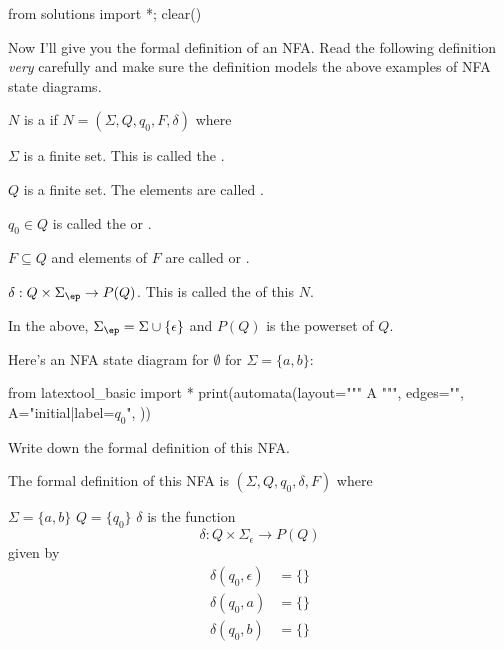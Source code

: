 \begin{python0}
  from solutions import *; clear()
\end{python0}

Now I'll give you the formal definition of an NFA.
Read the following
definition \textit{very} carefully and make sure the definition models
the above examples of NFA state diagrams.

\begin{defn}
  $N$ is a
  if $N =
  (\Sigma,Q,q_0,F,\delta)$ where
  \begin{tightlist}
  \item $\Sigma$ is a finite set. This is called the
    .
  \item $Q$ is a finite set. The elements are called
    .
  \item $q_0 \in Q$ is called the
    or
    \tinysidebarskip{}\sidebarskip{0pt}.
  \item $F \subseteq Q$ and elements of $F$ are called
    or
    \tinysidebarskip{}\sidebarskip{0pt}.
  \item $\delta : Q \times \Sigma_\ep \rightarrow P(Q)$.
    This is called the 
    of this $N$.
  \end{tightlist}
  In the above, $\Sigma_\ep = \Sigma \cup \{\epsilon\}$
  and $P(Q)$ is the powerset of $Q$.
\end{defn}

\newpage
\begin{ex}
  Here's an NFA state diagram
  for $\emptyset$ for $\Sigma = \{a,b\}$:

\begin{python}
from latextool_basic import *
print(automata(layout="""
A
""",
edges="",
A="initial|label=$q_0$",
))
\end{python}

Write down the formal definition of this NFA.
\end{ex}

\SOLUTION

The formal definition of this NFA is $(\Sigma, Q, q_0, \delta, F)$ where
\begin{tightlist}
\li $\Sigma = \{a,b\}$
\li $Q = \{q_0\}$
\li $\delta$ is the function
\[
\delta : Q \times \Sigma_\epsilon \rightarrow P(Q)
\]
given by
\begin{align*}
  \delta(q_0, \epsilon) &= \{\} \\
  \delta(q_0, a) &= \{\} \\
  \delta(q_0, b) &= \{\} 
\end{align*}
\end{tightlist}


